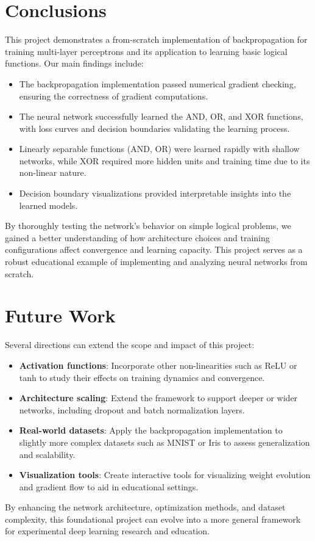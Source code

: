 \documentclass[11pt,a4paper]{article}
\begin{document}
\section{Conclusions}
\label{sec:conclusions}
This project demonstrates a from-scratch implementation of backpropagation for training multi-layer perceptrons and its application to learning basic logical functions. Our main findings include:

\begin{itemize}
\item The backpropagation implementation passed numerical gradient checking, ensuring the correctness of gradient computations.
\item The neural network successfully learned the AND, OR, and XOR functions, with loss curves and decision boundaries validating the learning process.
\item Linearly separable functions (AND, OR) were learned rapidly with shallow networks, while XOR required more hidden units and training time due to its non-linear nature.
\item Decision boundary visualizations provided interpretable insights into the learned models.
\end{itemize}

By thoroughly testing the network's behavior on simple logical problems, we gained a better understanding of how architecture choices and training configurations affect convergence and learning capacity. This project serves as a robust educational example of implementing and analyzing neural networks from scratch.

\section{Future Work}
\label{sec:future}
Several directions can extend the scope and impact of this project:

\begin{itemize}
\item \textbf{Activation functions}: Incorporate other non-linearities such as ReLU or tanh to study their effects on training dynamics and convergence.
\item \textbf{Architecture scaling}: Extend the framework to support deeper or wider networks, including dropout and batch normalization layers.
\item \textbf{Real-world datasets}: Apply the backpropagation implementation to slightly more complex datasets such as MNIST or Iris to assess generalization and scalability.
\item \textbf{Visualization tools}: Create interactive tools for visualizing weight evolution and gradient flow to aid in educational settings.
\end{itemize}

By enhancing the network architecture, optimization methods, and dataset complexity, this foundational project can evolve into a more general framework for experimental deep learning research and education.



\end{document}
